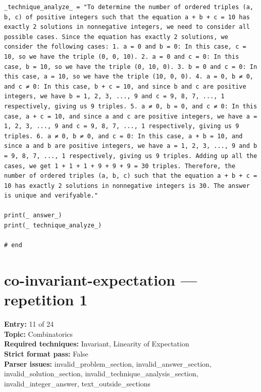 \documentclass[11pt]{article}
\begin{document}
\begin{Verbatim}[breaklines=true,breakanywhere=true,fontsize=\small]
_technique_analyze_ = "To determine the number of ordered triples (a, b, c) of positive integers such that the equation a + b + c = 10 has exactly 2 solutions in nonnegative integers, we need to consider all possible cases. Since the equation has exactly 2 solutions, we consider the following cases: 1. a = 0 and b = 0: In this case, c = 10, so we have the triple (0, 0, 10). 2. a = 0 and c = 0: In this case, b = 10, so we have the triple (0, 10, 0). 3. b = 0 and c = 0: In this case, a = 10, so we have the triple (10, 0, 0). 4. a = 0, b ≠ 0, and c ≠ 0: In this case, b + c = 10, and since b and c are positive integers, we have b = 1, 2, 3, ..., 9 and c = 9, 8, 7, ..., 1 respectively, giving us 9 triples. 5. a ≠ 0, b = 0, and c ≠ 0: In this case, a + c = 10, and since a and c are positive integers, we have a = 1, 2, 3, ..., 9 and c = 9, 8, 7, ..., 1 respectively, giving us 9 triples. 6. a ≠ 0, b ≠ 0, and c = 0: In this case, a + b = 10, and since a and b are positive integers, we have a = 1, 2, 3, ..., 9 and b = 9, 8, 7, ..., 1 respectively, giving us 9 triples. Adding up all the cases, we get 1 + 1 + 1 + 9 + 9 + 9 = 30 triples. Therefore, the number of ordered triples (a, b, c) such that the equation a + b + c = 10 has exactly 2 solutions in nonnegative integers is 30. The answer is unique and verifyable."

print(_ answer_)
print(_ technique_analyze_)

# end
\end{Verbatim}
\clearpage
\section{co-invariant-expectation --- repetition 1}
{\color{metadata}
\textbf{Entry:} 11 of 24\\
\textbf{Topic:} Combinatorics\\
\textbf{Required techniques:} Invariant, Linearity of Expectation\\
\textbf{Strict format pass:} False\\
\textbf{Parser issues:} invalid\_problem\_section, invalid\_answer\_section, invalid\_solution\_section, invalid\_technique\_analysis\_section, invalid\_integer\_answer, text\_outside\_sections
}
\end{document}

